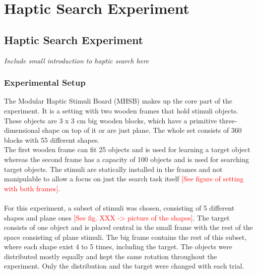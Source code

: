 
\chapter{Haptic Search Experiment} %

\label{Haptic Search Experiment} %


\section{Haptic Search Experiment}
\textit{Include small introduction to haptic search here}

\subsection{Experimental Setup}
The Modular Haptic Stimuli Board (MHSB) makes up the core part of the experiment. It is a setting with two wooden frames that hold stimuli objects. These objects are 3 x 3 cm big wooden blocks, which have a primitive three-dimensional shape on top of it or are just plane. The whole set consists of 360 blocks with 55 different shapes.\\
The first wooden frame can fit 25 objects and is used for learning a target object whereas the second frame has a capacity of 100 objects and is used for searching target objects. The stimuli are statically installed in the frames and not manipulable to allow a focus on just the search task itself \textcolor{red}{[See figure of setting with both frames]}.\\
\\
For this experiment, a subset of stimuli was chosen, consisting of 5 different shapes and plane ones \textcolor{red}{[See fig. XXX -> picture of the shapes]}. The target consists of one object and is placed central in the small frame with the rest of the space consisting of plane stimuli. The big frame contains the rest of this subset, where each shape exist 4 to 5 times, including the target. The objects were distributed mostly equally and kept the same rotation throughout the experiment. Only the distribution and the target were changed with each trial.

